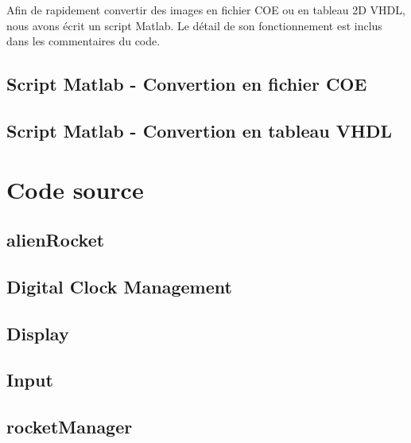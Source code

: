 \documentclass[french]{nakrule}
\begin{document}
Afin de rapidement convertir des images en fichier COE ou en tableau 2D VHDL,
nous avons écrit un script Matlab. Le détail de son fonctionnement est inclus
dans les commentaires du code.


\clearpage

\subsection{Script Matlab - Convertion en fichier COE}
\label{subsec:Script1}
\vspace{.1in}

\clearpage

\subsection{Script Matlab - Convertion en tableau VHDL}
\label{subsec:Script2}
\vspace{.1in}


\clearpage

\section{Code source}
\label{sec:code}

\subsection{alienRocket}


\clearpage
\subsection{Digital Clock Management}

\clearpage
\subsection{Display}

\clearpage
\subsection{Input}


\subsection{rocketManager}

\end{document}
